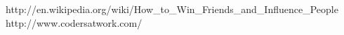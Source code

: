 \begin{center}
                      {http://en.wikipedia.org/wiki/How_to_Win_Friends_and_Influence_People}
                      {http://www.codersatwork.com/}

\end{center}
